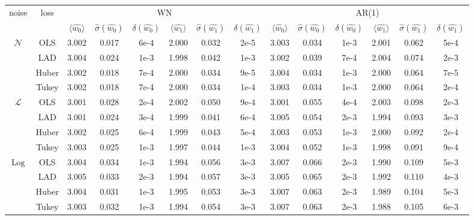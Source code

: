 \documentclass[12pt,a4paper]{article}
\newcommand{\normallaw}{\mathcal{N}}
\newcommand{\Laplacelaw}{\mathcal{L}}
\newcommand{\logisticlaw}{\operatorname{Log}}
\begin{document}
	\newpage
	\begin{center}
		\begin{tabular}{|c|c||ccc|ccc||ccc|ccc|}
			\hline
			\multirow{2}{*}{noise} & \multirow{2}{*}{loss} &
			\multicolumn{6}{c||}{WN} & \multicolumn{6}{c|}{AR(1)} \\
			\cline{3-14}
			&
			& $\langle\widehat{w_0}\rangle$ & $\widehat{\sigma}(\widehat{w_0})$ & $\delta(\widehat{w_0})$
			& $\langle\widehat{w_1}\rangle$ & $\widehat{\sigma}(\widehat{w_1})$ & $\delta(\widehat{w_1})$
			& $\langle\widehat{w_0}\rangle$ & $\widehat{\sigma}(\widehat{w_0})$ & $\delta(\widehat{w_0})$
			& $\langle\widehat{w_1}\rangle$ & $\widehat{\sigma}(\widehat{w_1})$ & $\delta(\widehat{w_1})$ \\
			\hline
			\multirow{4}{*}{$\normallaw$}
			& OLS   & 3.002 & 0.017 & 6e-4 & 2.000 & 0.032 & 2e-5 & 3.003 & 0.034 & 1e-3 & 2.001 & 0.062 & 5e-4 \\
			& LAD   & 3.004 & 0.024 & 1e-3 & 1.998 & 0.042 & 1e-3 & 3.002 & 0.039 & 7e-4 & 2.004 & 0.074 & 2e-3 \\
			& Huber & 3.002 & 0.018 & 7e-4 & 2.000 & 0.034 & 9e-5 & 3.004 & 0.034 & 1e-3 & 2.000 & 0.064 & 7e-5 \\
			& Tukey & 3.002 & 0.018 & 7e-4 & 2.000 & 0.034 & 1e-4 & 3.003 & 0.034 & 1e-3 & 2.000 & 0.064 & 2e-4 \\
			\hline
			\multirow{4}{*}{$\Laplacelaw$}
			& OLS   & 3.001 & 0.028 & 2e-4 & 2.002 & 0.050 & 9e-4 & 3.001 & 0.055 & 4e-4 & 2.003 & 0.098 & 2e-3 \\
			& LAD   & 3.001 & 0.024 & 3e-4 & 1.999 & 0.041 & 6e-4 & 3.005 & 0.054 & 2e-3 & 1.994 & 0.093 & 3e-3 \\
			& Huber & 3.002 & 0.025 & 6e-4 & 1.999 & 0.043 & 5e-4 & 3.003 & 0.053 & 1e-3 & 2.000 & 0.092 & 2e-4 \\
			& Tukey & 3.003 & 0.025 & 1e-3 & 1.997 & 0.044 & 1e-3 & 3.004 & 0.052 & 1e-3 & 1.998 & 0.091 & 9e-4 \\
			\hline
			\multirow{4}{*}{$\logisticlaw$}
			& OLS   & 3.004 & 0.034 & 1e-3 & 1.994 & 0.056 & 3e-3 & 3.007 & 0.066 & 2e-3 & 1.990 & 0.109 & 5e-3 \\
			& LAD   & 3.005 & 0.033 & 2e-3 & 1.994 & 0.057 & 3e-3 & 3.005 & 0.065 & 2e-3 & 1.992 & 0.110 & 4e-3 \\
			& Huber & 3.004 & 0.031 & 1e-3 & 1.995 & 0.053 & 3e-3 & 3.007 & 0.063 & 2e-3 & 1.989 & 0.104 & 5e-3 \\
			& Tukey & 3.003 & 0.032 & 1e-3 & 1.994 & 0.054 & 3e-3 & 3.007 & 0.063 & 2e-3 & 1.988 & 0.105 & 6e-3 \\

\end{tabular}
\end{center}
\end{document}
